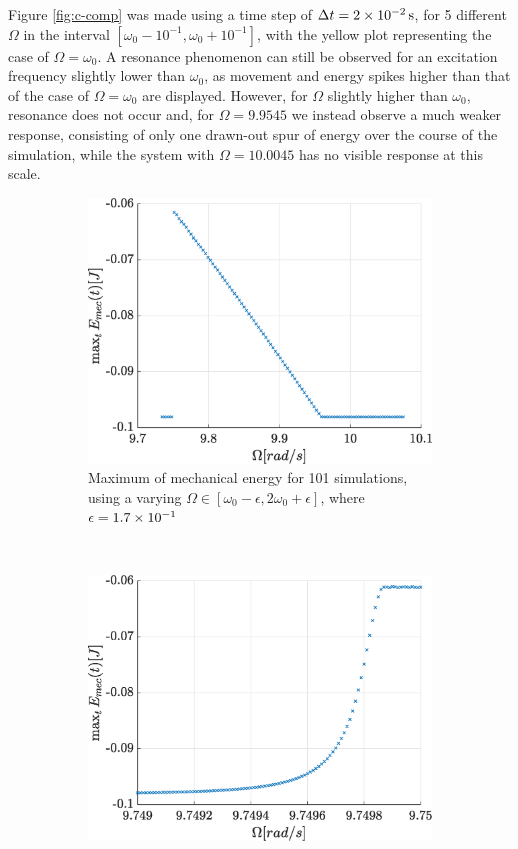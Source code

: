 \documentclass[a4paper,12pt,twoside]{article}
\begin{document}
Figure \ref{fig:c-comp} was made using a time step of $\Delta t = \SI{2d-2}{\s}$, for 5 different $\Omega$ in the interval $[\omega_0-10^{-1}, \omega_0+10^{-1}]$, with the yellow plot representing the case of $\Omega = \omega_0$. A resonance phenomenon can still be observed for an excitation frequency slightly lower than $\omega_0$, as movement and energy spikes higher than that of the case of $\Omega=\omega_0$ are displayed. However, for $\Omega$ slightly higher than $\omega_0$, resonance does not occur and, for $\Omega=9.9545$ we instead observe a much weaker response, consisting of only one drawn-out spur of energy over the course of the simulation, while the system with $\Omega=10.0045$ has no visible response at this scale.

\begin{figure}[h]
\centering
	\begin{subfigure}[t]{0.45\textwidth}
		\includegraphics[width=\textwidth]{graphs/c_emax.eps}
		\caption{Maximum of mechanical energy for \num{101} simulations, using a varying $\Omega\in\left[\omega_0 - \epsilon, 2\omega_0 + \epsilon\right]$, where $\epsilon = \num{1.7d-1}$}
		\label{fig:c-emax-full}
	\end{subfigure}
	~
	\begin{subfigure}[t]{0.45\textwidth}
		\includegraphics[width=\textwidth]{graphs/c_emaxzoom.eps}

\end{subfigure}
\end{figure}
\end{document}

